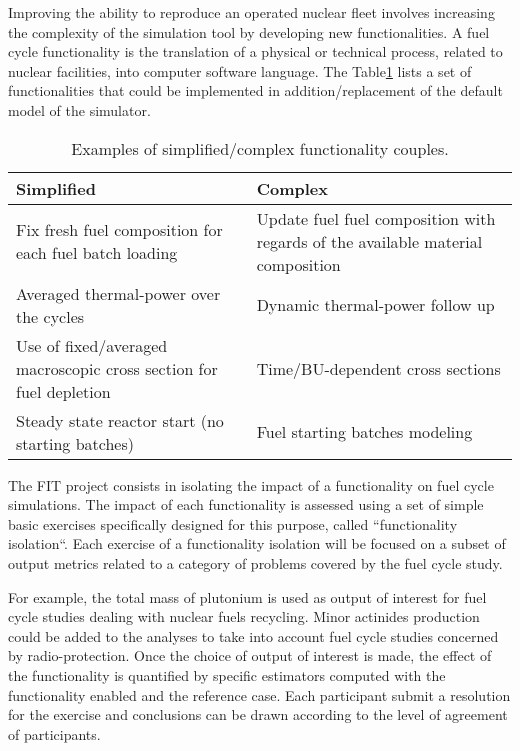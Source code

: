 Improving the ability to reproduce an operated nuclear fleet involves increasing
the complexity of the simulation tool by developing new functionalities. A fuel
cycle functionality is the translation of a physical or technical process,
related to nuclear facilities, into computer software language. The
Table\ref{Tab:Funct} lists a set of functionalities that could be implemented
in addition/replacement of the default model of the simulator.

\begin{table}[h]
\centering
\begin{tabular}{ |p{}|p{}| }
  \hline
  Simplified  & Complex
  \\ \hline
  Fix fresh fuel composition for each fuel batch loading 
  & Update fuel fuel composition with regards of the available material
  composition 
  \\ \hline
  Averaged thermal-power over the cycles 
  & Dynamic thermal-power follow up
  \\ \hline
  Use of fixed/averaged macroscopic cross section for fuel depletion
  & Time/\gls{BU}-dependent cross sections
  \\ \hline
  Steady state reactor start (no starting batches)
  & Fuel starting batches modeling \\
  \hline
\end{tabular}
\label{Tab:Funct}
\caption{Examples of simplified/complex functionality couples.}
\end{table}


The FIT project consists in isolating the impact of a functionality on fuel cycle simulations.
The impact of each functionality is assessed using a set of simple basic exercises specifically designed for this purpose, called ``functionality isolation``.
Each exercise of a functionality isolation will be focused on a subset of output metrics related to a category of problems covered by the fuel cycle study.

For example, the total mass of plutonium is used as output of interest for fuel cycle studies dealing with nuclear fuels recycling.
Minor actinides production could be added to the analyses to take into account fuel cycle studies concerned by radio-protection.
Once the choice of output of interest is made, the effect of the functionality is quantified by specific estimators computed with the functionality enabled and the reference case.
Each participant submit a resolution for the exercise and conclusions can be drawn according to the level of agreement of participants.

